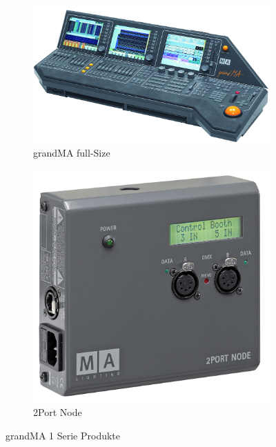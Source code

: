 \documentclass[11pt]{scrartcl}
\begin{document}
\begin{figure}[H]
    \centering
    \begin{subfigure}[b]{0.45\textwidth}
        \includegraphics[width=\textwidth]{images/grandMA_1.png}
        \caption{grandMA full-Size}
    \end{subfigure}
    \hfill 
    \begin{subfigure}[b]{0.25\textwidth}
        \includegraphics[width=\textwidth]{images/MA_2Port_Node_onPC_13019x.png}
        \caption{2Port Node \cite{gmaproducts}}
    \end{subfigure}
    \caption{grandMA 1 Serie Produkte}\label{fig:gma1}
\end{figure}
\end{document}
